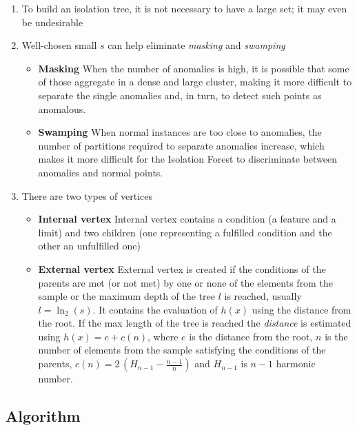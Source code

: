 \begin{enumerate}
    \item To build an isolation tree, it is not necessary to have a large set; it
  may even be undesirable
  \item Well-chosen small \(s\) can help eliminate \emph{masking} and
  \emph{swamping}


\begin{itemize}
    \item \textbf{Masking} When the number of anomalies is high, it is possible that some of those aggregate in a dense and large cluster, making it more difficult to separate the single anomalies and, in turn, to detect such points as
  anomalous.
    \item \textbf{Swamping} When normal instances are too close to anomalies, the number of
  partitions required to separate anomalies increase, which makes it more difficult for the Isolation Forest to discriminate between
  anomalies and normal points.
\end{itemize}

\item There are two types of vertices

\begin{itemize}
    \item \textbf{Internal vertex} Internal vertex contains a condition (a feature and a limit) and two children (one
  representing a fulfilled condition and the other an unfulfilled one)
    \item \textbf{External vertex} External vertex is created if the conditions of the parents are met (or not met) by
  one or none of the elements from the sample or the maximum depth of
  the tree \(l\) is reached, usually \(l=\ln_2(s)\). It contains the
  evaluation of \(h(x)\) using the distance from the root. If the max
  length of the tree is reached the \emph{distance} is estimated using
  \(h(x)=e+c(n)\), where \(e\) is the distance from the root, \(n\) is
  the number of elements from the sample satisfying the conditions of
  the parents, \(c(n)=2\,(H_{n-1}-\frac{n-1}{n})\) and \(H_{n-1}\) is
  \(n-1\) harmonic number.
\end{itemize}

\end{enumerate}

\subsection{Algorithm}

